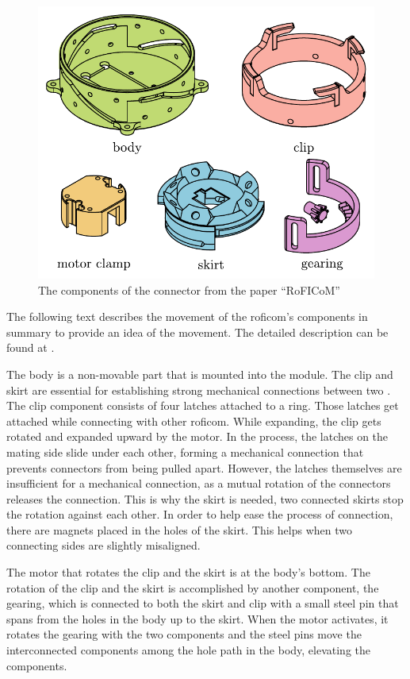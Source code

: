 \documentclass[
  digital,     %
  oneside,     %
  nosansbold,  %
  nocolorbold, %
  nolof,         %
  nolot,         %
]{fithesis4}
\begin{document}
\begin{figure}[ht]
    \includegraphics{ dock_components.pdf }
    \caption{ The components of the connector from the paper ``RoFICoM'' \cite{MrazekBarnat2019Roficom} }
    \label{fig:key-components}
\end{figure}

The following text describes the movement of the \acrshort{roficom}'s components in summary to
provide an idea of the movement. The detailed description can be found at
\cite[p.~10--13]{Mrazek2019thesis}.

The body is a non-movable part that is mounted into the module.  The clip and skirt are essential
for establishing strong mechanical connections between two .  The clip component
consists of four latches attached to a ring. Those latches get attached while connecting with other
\acrshort{roficom}. While expanding, the clip gets rotated and expanded upward by the motor. In the
process, the latches on the mating side slide under each other, forming a mechanical connection that
prevents connectors from being pulled apart.  However, the latches themselves are insufficient for a
mechanical connection, as a mutual rotation of the connectors releases the connection. This is why
the skirt is needed, two connected skirts stop the rotation against each other. In order to help
ease the process of connection, there are magnets placed in the holes of the skirt. This helps when
two connecting sides are slightly misaligned.

The motor that rotates the clip and the skirt is at the body's bottom. The rotation of the clip and
the skirt is accomplished by another component, the gearing, which is connected to both the skirt
and clip with a small steel pin that spans from the holes in the body up to the skirt. When the
motor activates, it rotates the gearing with the two components and the steel pins move the
interconnected components among the hole path in the body, elevating the components.
\end{document}
